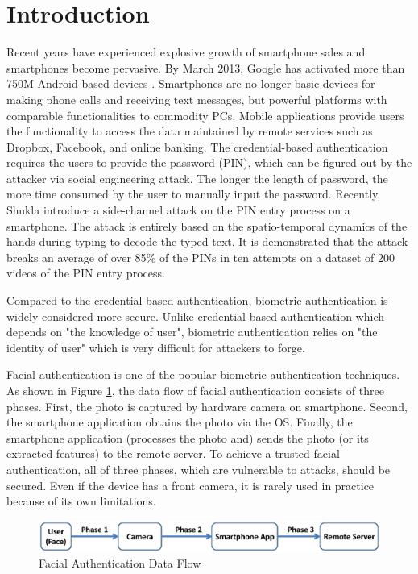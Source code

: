 \section{Introduction}
\label{sec:introduction}

Recent years have experienced explosive growth of smartphone sales and
smartphones become pervasive. By March 2013, Google has activated more than 750M
Android-based devices \cite{Google-ARM}.  Smartphones are no longer basic
devices for making phone calls and receiving text messages, but powerful
platforms with comparable functionalities to commodity PCs.  Mobile applications
provide users the functionality to access the data maintained by remote services
such as Dropbox, Facebook, and online banking. The credential-based
authentication requires the users to provide the password (PIN), which can be
figured out by the attacker via social engineering attack. The longer the length of
password, the more time consumed by the user to manually input the password.
Recently, Shukla \etal \cite{Hand-Secret} introduce a side-channel attack on
the PIN entry process on a smartphone. The attack is entirely based on the
spatio-temporal dynamics of the hands during typing to decode the typed text. It
is demonstrated that the attack breaks an average of over 85\% of the PINs in
ten attempts on a dataset of 200 videos of the PIN entry process.

Compared to the credential-based authentication, biometric authentication is
widely considered more secure. Unlike credential-based authentication
which depends on "the knowledge of user", biometric authentication relies on "the
identity of user" which is very difficult for attackers to forge.

Facial authentication is one of the popular biometric authentication techniques.
 As shown in Figure \ref{fig:dataflow}, the data flow of
facial authentication consists of three phases. First, the photo is captured by
hardware camera on smartphone.  Second, the smartphone application obtains
the photo via the OS.  Finally, the smartphone application (processes the photo
and) sends the photo (or its extracted features) to the remote server. To achieve a trusted facial
authentication, all of three phases, which are vulnerable to attacks,  should be
secured. Even if the device has a front camera, it is rarely used in practice because of
its own limitations.

\begin{figure}[htb]
	\centering
	\includegraphics[width=1.0\columnwidth]{figures/dataflow.eps}
	\caption{Facial Authentication Data Flow}
	\label{fig:dataflow}
\end{figure}

